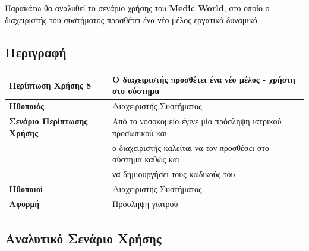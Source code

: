 \documentclass{article}
\newcommand\T{\rule{0pt}{2.6ex}}       %
\newcommand\B{\rule[-1.2ex]{0pt}{0pt}}
\begin{document}
Παρακάτω θα αναλυθεί το σενάριο χρήσης του \textbf{Medic World}, στο οποίο ο διαχειριστής του συστήματος προσθέτει ένα νέο μέλος εργατικό δυναμικό.

\subsection{Περιγραφή}

\begin{center}
     \begin{tabular}{|l|l|}
     \hline
      \textbf{Περίπτωση Χρήσης 8} & Ο διαχειριστής προσθέτει ένα νέο μέλος - χρήστη στο σύστημα \T\B \\ 
      \hline
      \textbf{Ηθοποιός} & Διαχειριστής Συστήματος \T\B \\
      \hline
      \textbf{Σενάριο Περίπτωσης Χρήσης} & Από το νοσοκομείο έγινε μία πρόσληψη ιατρικού προσωπικού και \T \\& ο διαχειριστής καλείται να τον προσθέσει στο σύστημα καθώς και \\& να δημιουργήσει τους κωδικούς του \B \\
      \hline
      \textbf{Ηθοποιοί} & Διαχειριστής Συστήματος \T\B \\
      \hline
      \textbf{Αφορμή} & Πρόσληψη γιατρού \T\B \\
      \hline
     \end{tabular}
 \end{center}

\subsection{Αναλυτικό Σενάριο Χρήσης}
\end{document}
